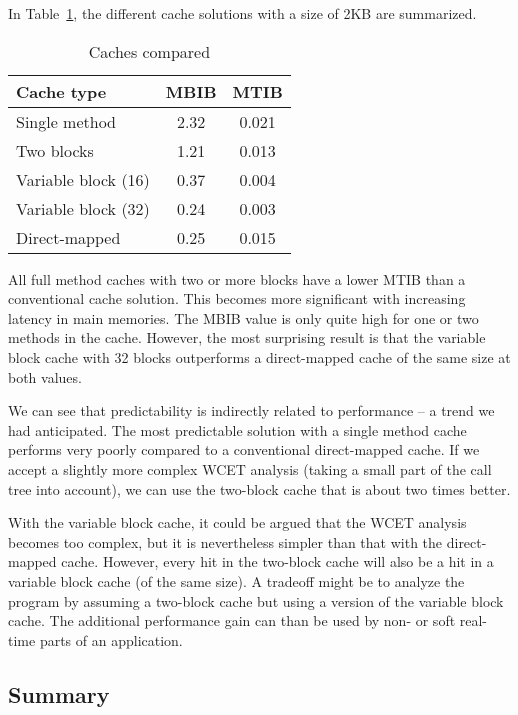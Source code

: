 In Table~\ref{tab_cache_compared}, the different cache solutions with
a size of 2KB are summarized.
%
\begin{table}
    \centering
    \begin{tabular}{lcc}
    \toprule

    Cache type & MBIB & MTIB \\

    \midrule
        Single method        & 2.32 & 0.021  \\
        Two blocks           & 1.21 & 0.013  \\
        Variable block (16)  & 0.37 & 0.004  \\
        Variable block (32)  & 0.24 & 0.003  \\
        Direct-mapped        & 0.25 & 0.015 \\
    \bottomrule

    \end{tabular}
    \caption{Caches compared}
    \label{tab_cache_compared}
\end{table}
%
All full method caches with two or more blocks have a lower MTIB
than a conventional cache solution. This becomes more significant
with increasing latency in main memories. The MBIB value is only
quite high for one or two methods in the cache. However, the most
surprising result is that the variable block cache with 32 blocks
outperforms a direct-mapped cache of the same size at both values.

We can see that predictability is indirectly related to performance
-- a trend we had anticipated. The most predictable solution with a
single method cache performs very poorly compared to a conventional
direct-mapped cache. If we accept a slightly more complex WCET
analysis (taking a small part of the call tree into account), we can
use the two-block cache that is about two times better.

With the variable block cache, it could be argued that the WCET
analysis becomes too complex, but it is nevertheless simpler than
that with the direct-mapped cache. However, every hit in the
two-block cache will also be a hit in a variable block cache (of the
same size). A tradeoff might be to analyze the program by assuming a
two-block cache but using a version of the variable block cache. The
additional performance gain can than be used by non- or soft
real-time parts of an application.


\subsection{Summary}

